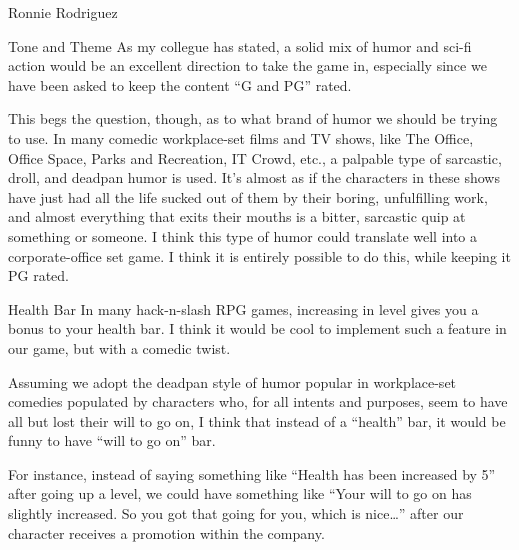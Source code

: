\documentclass[12pt]{report}
\begin{document}
\begin{section}{Ronnie Rodriguez}
\begin{subsection}{Tone and Theme}
As my collegue has stated, a solid mix of humor and sci-fi action would be
an excellent direction to take the game in, especially since we have been
asked to keep the content ``G and PG'' rated. 

This begs the question, though, as to what brand of humor we should be
trying to use. In many comedic workplace-set films and TV shows, like The
Office, Office Space, Parks and Recreation, IT Crowd, etc., a palpable type
of sarcastic, droll, and deadpan humor is used. It's almost as if the
characters in these shows have just had all the life sucked out of them by
their boring, unfulfilling work, and almost everything that exits their
mouths is a bitter, sarcastic quip at something or someone. I think this
type of humor could translate well into a corporate-office set game. I
think it is entirely possible to do this, while keeping it PG rated. 
\end{subsection}

\begin{subsection}{Health Bar}
In many hack-n-slash RPG games, increasing in level gives you a bonus to 
your health bar. I think it would be cool to implement such a feature in
our game, but with a comedic twist. 

Assuming we adopt the deadpan style of humor popular in workplace-set
comedies populated by characters who, for all intents and purposes, seem to
have all but lost their will to go on, I think that instead of a ``health''
bar, it would be funny to have ``will to go on'' bar. 

For instance, instead of saying something like ``Health has been increased
by 5'' after going up a level, we could have something like ``Your will to
go on has slightly increased. So you got that going for you, which is
nice\ldots'' after our character receives a promotion within the company.
\end{subsection}
\end{section}
\end{document}
